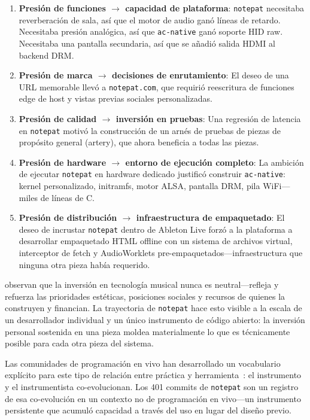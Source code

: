 \documentclass[10pt,letterpaper,twocolumn]{article}
\begin{document}
\begin{enumerate}
  \item \textbf{Presión de funciones $\rightarrow$ capacidad de plataforma}: \texttt{notepat} necesitaba reverberación de sala, así que el motor de audio ganó líneas de retardo. Necesitaba presión analógica, así que \texttt{ac-native} ganó soporte HID raw. Necesitaba una pantalla secundaria, así que se añadió salida HDMI al backend DRM.
  \item \textbf{Presión de marca $\rightarrow$ decisiones de enrutamiento}: El deseo de una URL memorable llevó a \texttt{notepat.com}, que requirió reescritura de funciones edge de host y vistas previas sociales personalizadas.
  \item \textbf{Presión de calidad $\rightarrow$ inversión en pruebas}: Una regresión de latencia en \texttt{notepat} motivó la construcción de un arnés de pruebas de piezas de propósito general (artery), que ahora beneficia a todas las piezas.
  \item \textbf{Presión de hardware $\rightarrow$ entorno de ejecución completo}: La ambición de ejecutar \texttt{notepat} en hardware dedicado justificó construir \texttt{ac-native}: kernel personalizado, initramfs, motor ALSA, pantalla DRM, pila WiFi---miles de líneas de C.
  \item \textbf{Presión de distribución $\rightarrow$ infraestructura de empaquetado}: El deseo de incrustar \texttt{notepat} dentro de Ableton Live forzó a la plataforma a desarrollar empaquetado HTML offline con un sistema de archivos virtual, interceptor de fetch y AudioWorklets pre-empaquetados---infraestructura que ninguna otra pieza había requerido.
\end{enumerate}

\citet{born2015music} observan que la inversión en tecnología musical nunca es neutral---refleja y refuerza las prioridades estéticas, posiciones sociales y recursos de quienes la construyen y financian. La trayectoria de \texttt{notepat} hace esto visible a la escala de un desarrollador individual y un único instrumento de código abierto: la inversión personal sostenida en una pieza moldea materialmente lo que es técnicamente posible para cada otra pieza del sistema.

Las comunidades de programación en vivo han desarrollado un vocabulario explícito para este tipo de relación entre práctica y herramienta~\citep{blackwell2022livecoding}: el instrumento y el instrumentista co-evolucionan. Los 401 commits de \texttt{notepat} son un registro de esa co-evolución en un contexto no de programación en vivo---un instrumento persistente que acumuló capacidad a través del uso en lugar del diseño previo.
\end{document}
